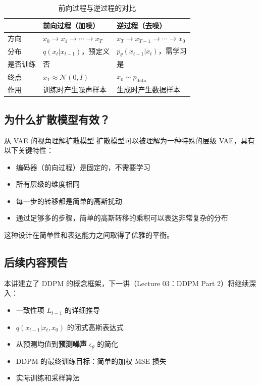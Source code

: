 \documentclass[a4paper]{article}
\begin{document}
\begin{table}[H]
\centering
\begin{tabular}{lll}
\toprule
 & \textbf{前向过程（加噪）} & \textbf{逆过程（去噪）} \\
\midrule
方向 & $x_0 \to x_1 \to \cdots \to x_T$ & $x_T \to x_{T-1} \to \cdots \to x_0$ \\
分布 & $q(x_t | x_{t-1})$，预定义 & $p_\theta(x_{t-1} | x_t)$，需学习 \\
是否训练 & 否 & 是 \\
终点 & $x_T \approx \mathcal{N}(0, I)$ & $x_0 \sim p_{\text{data}}$ \\
作用 & 训练时产生噪声样本 & 生成时产生数据样本 \\
\bottomrule
\end{tabular}
\caption{前向过程与逆过程的对比}
\end{table}

\subsection{为什么扩散模型有效？}

\begin{knowledgebox}{从 VAE 的视角理解扩散模型}
扩散模型可以被理解为一种特殊的层级 VAE，具有以下关键特性：
\begin{itemize}
    \item 编码器（前向过程）是固定的，不需要学习
    \item 所有层级的维度相同
    \item 每一步的转移都是简单的高斯扰动
    \item 通过足够多的步骤，简单的高斯转移的乘积可以表达非常复杂的分布
\end{itemize}
这种设计在简单性和表达能力之间取得了优雅的平衡。
\end{knowledgebox}

\subsection{后续内容预告}

本讲建立了 DDPM 的概念框架，下一讲（Lecture 03：DDPM Part 2）将继续深入：

\begin{itemize}
    \item 一致性项 $L_{t-1}$ 的详细推导
    \item $q(x_{t-1}|x_t, x_0)$ 的闭式高斯表达式
    \item 从预测均值到\textbf{预测噪声} $\epsilon_\theta$ 的简化
    \item DDPM 的最终训练目标：简单的加权 MSE 损失
    \item 实际训练和采样算法
\end{itemize}
\end{document}
